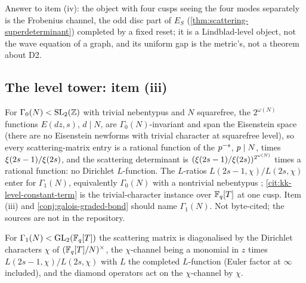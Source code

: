 Answer to item (iv): the object with four cusps seeing the four modes separately is the Frobenius channel,
the odd disc part of $E_S$ (\cref{thm:scattering-superdeterminant}) completed by a fixed reset; it is a
Lindblad-level object, not the wave equation of a graph, and its uniform gap is the metric's, not a theorem
about D2.

\subsection{The level tower: item (iii)}

\begin{observation}
\label{obs:level-tower-correction}
For $\Gamma_0(N)<\mathrm{SL}_2(\mathbb Z)$ with trivial nebentypus and $N$ squarefree, the $2^{\omega(N)}$ functions
$E(dz,s)$, $d\mid N$, are $\Gamma_0(N)$-invariant and span the Eisenstein space (there are no Eisenstein newforms
with trivial character at squarefree level), so every scattering-matrix entry is a rational function of the
$p^{-s}$, $p\mid N$, times $\xi(2s-1)/\xi(2s)$, and the scattering determinant is
$(\xi(2s-1)/\xi(2s))^{2^{\omega(N)}}$ times a rational function: no Dirichlet $L$-function. The $L$-ratios
$L(2s-1,\chi)/L(2s,\chi)$ enter for $\Gamma_1(N)$, equivalently $\Gamma_0(N)$ with a nontrivial nebentypus
\cite{huxley1984scattering,hejhal1983selberg2}; \cref{cit:kk-level-constant-term} is the trivial-character
instance over $\mathbb F_q[T]$ at one cusp. Item (iii) and \cref{conj:galois-graded-bond} should name $\Gamma_1(N)$.
Not byte-cited; the sources are not in the repository.
\end{observation}

\begin{assumption}[H-ARITH-1]
\label{asm:h-arith-gamma1}
For $\Gamma_1(N)<\mathrm{GL}_2(\mathbb F_q[T])$ the scattering matrix is diagonalised by the Dirichlet characters $\chi$ of
$(\mathbb F_q[T]/N)^\times$, the $\chi$-channel being a monomial in $z$ times $L(2s-1,\chi)/L(2s,\chi)$ with $L$ the
completed $L$-function (Euler factor at $\infty$ included), and the diamond operators act on the $\chi$-channel by
$\chi$.
\end{assumption}

